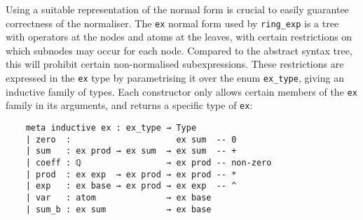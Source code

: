 \documentclass{llncs}
\newcommand{\lean}[1]{\texttt{#1}\xspace} %
\newcommand{\ex}{\lean{ex}}
\newcommand{\ring}{\lean{ring}}
\newcommand{\ringexp}{\lean{ring\_exp}}
\begin{document}

Using a suitable representation of the normal form is crucial to easily guarantee correctness of the normaliser.
The \ex normal form used by \ringexp is a tree with operators at the nodes and atoms at the leaves,
with certain restrictions on which subnodes may occur for each node.
Compared to the abstract syntax tree, this will prohibit certain non-normalised subexpressions.
These restrictions are expressed in the \ex type by parametrising it over the enum \lean{ex\_type},
giving an inductive family of types.
Each constructor only allows certain members of the \ex family in its arguments,
and returns a specific type of \ex:

\begin{lstlisting}
	meta inductive ex : ex_type → Type
	| zero  :                     ex sum  -- 0
	| sum   : ex prod → ex sum  → ex sum  -- +
	| coeff : ℚ                 → ex prod -- non-zero
	| prod  : ex exp  → ex prod → ex prod -- *
	| exp   : ex base → ex prod → ex exp  -- ^
	| var   : atom              → ex base
	| sum_b : ex sum            → ex base
\end{lstlisting} %
\end{document}
